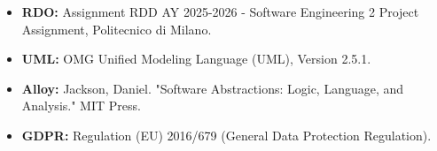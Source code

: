 \begin{itemize} 
    \item \textbf{RDO:} Assignment RDD AY 2025-2026 - Software Engineering 2 Project Assignment, Politecnico di Milano. 
    \item \textbf{UML:} OMG Unified Modeling Language (UML), Version 2.5.1. 
    \item \textbf{Alloy:} Jackson, Daniel. "Software Abstractions: Logic, Language, and Analysis." MIT Press. 
    \item \textbf{GDPR:} Regulation (EU) 2016/679 (General Data Protection Regulation). 
\end{itemize}
